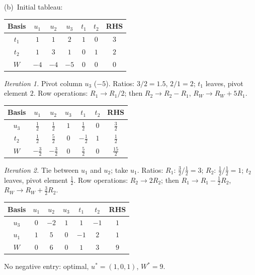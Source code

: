 \begin{solutions}
        (b)~Initial tableau:
        \begin{center}
        \begin{tabular}{c|ccccc|c}
        Basis & $u_{1}$ & $u_{2}$ & $u_{3}$ & $t_{1}$ & $t_{2}$ & RHS\\
        \hline
        $t_{1}$ & $1$ & $1$ & $2$ & $1$ & $0$ & $3$\\
        $t_{2}$ & $1$ & $3$ & $1$ & $0$ & $1$ & $2$\\
        \hline
        $W$ & $-4$ & $-4$ & $-5$ & $0$ & $0$ & $0$\\
        \end{tabular}
        \end{center}
        \emph{Iteration 1.} Pivot column $u_{3}$ ($-5$). Ratios:
        $3/2=1.5$, $2/1=2$; $t_{1}$ leaves, pivot element $2$. Row
        operations: $R_{1}\to R_{1}/2$; then $R_{2}\to R_{2}-R_{1}$,
        $R_{W}\to R_{W}+5R_{1}$.
        \begin{center}
        \begin{tabular}{c|ccccc|c}
        Basis & $u_{1}$ & $u_{2}$ & $u_{3}$ & $t_{1}$ & $t_{2}$ & RHS\\
        \hline
        $u_{3}$ & $\tfrac12$ & $\tfrac12$ & $1$ & $\tfrac12$ & $0$ & $\tfrac32$\\
        $t_{2}$ & $\tfrac12$ & $\tfrac52$ & $0$ & $-\tfrac12$ & $1$ & $\tfrac12$\\
        \hline
        $W$ & $-\tfrac32$ & $-\tfrac32$ & $0$ & $\tfrac52$ & $0$ & $\tfrac{15}{2}$\\
        \end{tabular}
        \end{center}
        \emph{Iteration 2.} Tie between $u_{1}$ and $u_{2}$; take $u_{1}$.
        Ratios: $R_{1}$: $\tfrac32\big/\tfrac12=3$; $R_{2}$:
        $\tfrac12\big/\tfrac12=1$; $t_{2}$ leaves, pivot element
        $\tfrac12$. Row operations: $R_{2}\to 2R_{2}$; then
        $R_{1}\to R_{1}-\tfrac12R_{2}$, $R_{W}\to R_{W}+\tfrac32R_{2}$.
        \begin{center}
        \begin{tabular}{c|ccccc|c}
        Basis & $u_{1}$ & $u_{2}$ & $u_{3}$ & $t_{1}$ & $t_{2}$ & RHS\\
        \hline
        $u_{3}$ & $0$ & $-2$ & $1$ & $1$ & $-1$ & $1$\\
        $u_{1}$ & $1$ & $5$ & $0$ & $-1$ & $2$ & $1$\\
        \hline
        $W$ & $0$ & $6$ & $0$ & $1$ & $3$ & $9$\\
        \end{tabular}
        \end{center}
        No negative entry: optimal, $u^{*}=(1,0,1)$, $W^{*}=9$.


\end{solutions}
